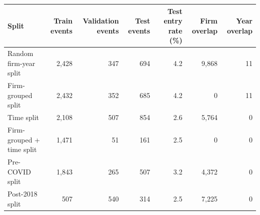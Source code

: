 \begin{table}[!ht]
 \label{tab:split_diagnostics_v2}
\centering
\begin{tabular}{lrrrrrr}
\hline
Split & Train events & Validation events & Test events & Test entry rate (\%) & Firm overlap & Year overlap \\
\hline
Random firm-year split & 2,428 & 347 & 694 & 4.2 & 9,868 & 11 \\
Firm-grouped split & 2,432 & 352 & 685 & 4.2 & 0 & 11 \\
Time split & 2,108 & 507 & 854 & 2.6 & 5,764 & 0 \\
Firm-grouped + time split & 1,471 & 51 & 161 & 2.5 & 0 & 0 \\
Pre-COVID split & 1,843 & 265 & 507 & 3.2 & 4,372 & 0 \\
Post-2018 split & 507 & 540 & 314 & 2.5 & 7,225 & 0 \\
\hline
\end{tabular}
\end{table}
